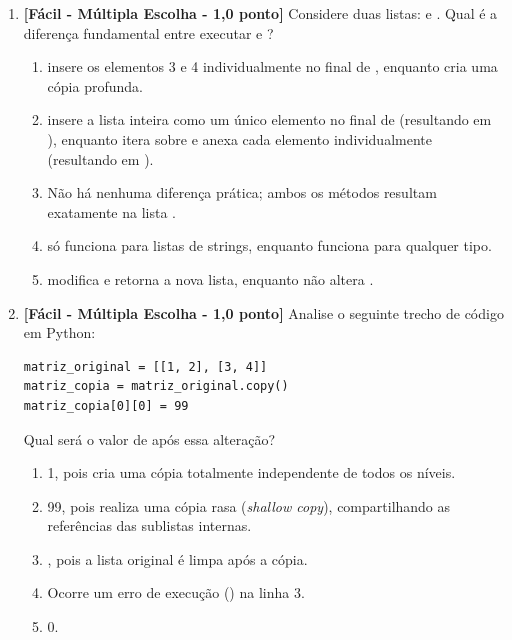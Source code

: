 \begin{enumerate}[label=\textbf{Q\arabic*.}, start=49]

\item \textbf{[Fácil - Múltipla Escolha - 1,0 ponto]} Considere duas listas:  e . Qual é a diferença fundamental entre executar  e ?

\begin{enumerate}[label=\textbf{(\Alph*)}]
    \item {} insere os elementos 3 e 4 individualmente no final de , enquanto  cria uma cópia profunda.
    \item {} insere a lista  inteira como um único elemento no final de  (resultando em \code{[1, 2, [3, 4]]}), enquanto  itera sobre  e anexa cada elemento individualmente (resultando em \code{[1, 2, 3, 4]}).
    \item Não há nenhuma diferença prática; ambos os métodos resultam exatamente na lista \code{[1, 2, 3, 4]}.
    \item {} só funciona para listas de strings, enquanto  funciona para qualquer tipo.
    \item {} modifica  e retorna a nova lista, enquanto  não altera .
\end{enumerate}



\vspace{0.4cm}

\item \textbf{[Fácil - Múltipla Escolha - 1,0 ponto]} Analise o seguinte trecho de código em Python:
\begin{verbatim}
matriz_original = [[1, 2], [3, 4]]
matriz_copia = matriz_original.copy()
matriz_copia[0][0] = 99
\end{verbatim}
Qual será o valor de  após essa alteração?

\begin{enumerate}[label=\textbf{(\Alph*)}]
    \item 1, pois  cria uma cópia totalmente independente de todos os níveis.
    \item 99, pois  realiza uma cópia rasa (\emph{shallow copy}), compartilhando as referências das sublistas internas.
    \item {}, pois a lista original é limpa após a cópia.
    \item Ocorre um erro de execução () na linha 3.
    \item 0.
\end{enumerate}


\end{enumerate}
